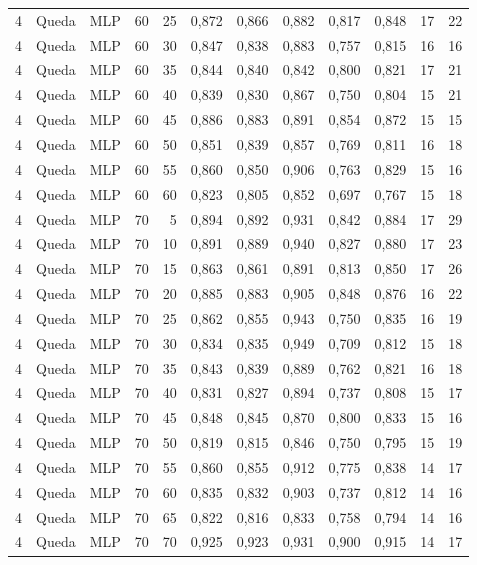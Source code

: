 \begin{longtable}{@{}rllrrrrrrrrr@{}}
4 & Queda & MLP & 60 & 25 & 0,872 & 0,866 & 0,882 & 0,817 & 0,848 & 17 & 22 \\
4 & Queda & MLP & 60 & 30 & 0,847 & 0,838 & 0,883 & 0,757 & 0,815 & 16 & 16 \\
4 & Queda & MLP & 60 & 35 & 0,844 & 0,840 & 0,842 & 0,800 & 0,821 & 17 & 21 \\
4 & Queda & MLP & 60 & 40 & 0,839 & 0,830 & 0,867 & 0,750 & 0,804 & 15 & 21 \\
4 & Queda & MLP & 60 & 45 & 0,886 & 0,883 & 0,891 & 0,854 & 0,872 & 15 & 15 \\
4 & Queda & MLP & 60 & 50 & 0,851 & 0,839 & 0,857 & 0,769 & 0,811 & 16 & 18 \\
4 & Queda & MLP & 60 & 55 & 0,860 & 0,850 & 0,906 & 0,763 & 0,829 & 15 & 16 \\
4 & Queda & MLP & 60 & 60 & 0,823 & 0,805 & 0,852 & 0,697 & 0,767 & 15 & 18 \\
4 & Queda & MLP & 70 & 5 & 0,894 & 0,892 & 0,931 & 0,842 & 0,884 & 17 & 29 \\
4 & Queda & MLP & 70 & 10 & 0,891 & 0,889 & 0,940 & 0,827 & 0,880 & 17 & 23 \\
4 & Queda & MLP & 70 & 15 & 0,863 & 0,861 & 0,891 & 0,813 & 0,850 & 17 & 26 \\
4 & Queda & MLP & 70 & 20 & 0,885 & 0,883 & 0,905 & 0,848 & 0,876 & 16 & 22 \\
4 & Queda & MLP & 70 & 25 & 0,862 & 0,855 & 0,943 & 0,750 & 0,835 & 16 & 19 \\
4 & Queda & MLP & 70 & 30 & 0,834 & 0,835 & 0,949 & 0,709 & 0,812 & 15 & 18 \\
4 & Queda & MLP & 70 & 35 & 0,843 & 0,839 & 0,889 & 0,762 & 0,821 & 16 & 18 \\
4 & Queda & MLP & 70 & 40 & 0,831 & 0,827 & 0,894 & 0,737 & 0,808 & 15 & 17 \\
4 & Queda & MLP & 70 & 45 & 0,848 & 0,845 & 0,870 & 0,800 & 0,833 & 15 & 16 \\
4 & Queda & MLP & 70 & 50 & 0,819 & 0,815 & 0,846 & 0,750 & 0,795 & 15 & 19 \\
4 & Queda & MLP & 70 & 55 & 0,860 & 0,855 & 0,912 & 0,775 & 0,838 & 14 & 17 \\
4 & Queda & MLP & 70 & 60 & 0,835 & 0,832 & 0,903 & 0,737 & 0,812 & 14 & 16 \\
4 & Queda & MLP & 70 & 65 & 0,822 & 0,816 & 0,833 & 0,758 & 0,794 & 14 & 16 \\
4 & Queda & MLP & 70 & 70 & 0,925 & 0,923 & 0,931 & 0,900 & 0,915 & 14 & 17 \\

\end{longtable}
